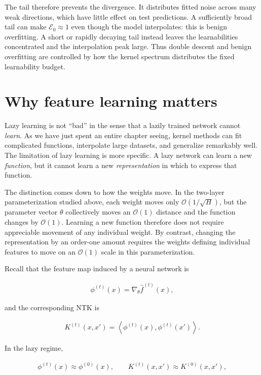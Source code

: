 The tail therefore prevents the divergence. It distributes fitted noise across many
weak directions, which have little effect on test predictions. A sufficiently broad
tail can make $\mathcal{E}_0\approx1$ even though the model interpolates: this is benign
overfitting. A short or rapidly decaying tail instead leaves the learnabilities
concentrated and the interpolation peak large. Thus double descent and benign
overfitting are controlled by how the kernel spectrum distributes the fixed
learnability budget.


\section{Why feature learning matters}

Lazy learning is not ``bad'' in the sense that a lazily trained network cannot \textit{learn}. As we have just spent an entire chapter seeing, kernel methods can fit complicated functions, interpolate large datasets, and generalize remarkably well. The limitation of lazy learning is more specific. A lazy network can learn a new \textit{function}, but it cannot learn a new \textit{representation} in which to express that function.

The distinction comes down to how the weights move. In the two-layer parameterization studied above, each weight moves only $\mathcal{O}(1/\sqrt{H})$, but the parameter vector $\theta$ collectively moves an $\mathcal{O}(1)$ distance and the function changes by $\mathcal{O}(1)$. Learning a new function therefore does not require appreciable movement of any individual weight. By contrast, changing the representation by an order-one amount requires the weights defining individual features to move on an $\mathcal{O}(1)$ scale in this parameterization.

Recall that the feature map induced by a neural network is

\begin{align}
    \phi^{(t)}(x) = \nabla_\theta \hat f^{(t)}(x),
\end{align}

and the corresponding NTK is

\begin{align}
    K^{(t)}(x,x') =
    \left\langle \phi^{(t)}(x),\phi^{(t)}(x')\right\rangle .
\end{align}

In the lazy regime,

\begin{align}
    \phi^{(t)}(x) \approx \phi^{(0)}(x),
    \qquad
    K^{(t)}(x,x') \approx K^{(0)}(x,x'),
\end{align}

